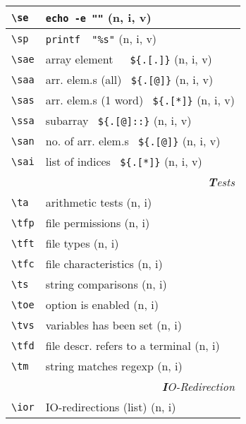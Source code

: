 \documentclass[oneside,11pt,landscape,DIV16]{scrartcl}
\begin{document}
\begin{multicols}{3}
\begin{center}
\begin{tabular}[]{|p{11mm}|p{60mm}|}
%
\hline \verb'\se'  & \verb'echo -e ""'                     \hfill (n, i, v)\\
\hline \verb'\sp'  & \verb'printf  "%s"'                   \hfill (n, i, v)\\
%
\hline \verb'\sae' & array element\ \ \ \verb'${.[.]}'     \hfill (n, i, v)\\
\hline \verb'\saa' & arr. elem.s (all) \ \verb'${.[@]}'    \hfill (n, i, v)\\
\hline \verb'\sas' & arr. elem.s (1 word) \ \verb'${.[*]}' \hfill (n, i, v)\\
\hline \verb'\ssa' & subarray \ \verb'${.[@]::}'           \hfill (n, i, v)\\
\hline \verb'\san' & no. of arr. elem.s \ \verb'${.[@]}'   \hfill (n, i, v)\\
\hline \verb'\sai' & list of indices \ \verb'${.[*]}'      \hfill (n, i, v)\\
\hline
\hline
\multicolumn{2}{|r|}{\textsl{\textbf{T}ests}}                 \\[1.0ex]
\hline \verb'\ta'  & arithmetic tests                  \hfill (n, i)\\
\hline \verb'\tfp' & file permissions                  \hfill (n, i)\\
\hline \verb'\tft' & file types                        \hfill (n, i)\\
\hline \verb'\tfc' & file characteristics              \hfill (n, i)\\
\hline \verb'\ts'  & string comparisons                \hfill (n, i)\\
\hline \verb'\toe' & option is enabled                 \hfill (n, i)\\
\hline \verb'\tvs' & variables has been set            \hfill (n, i)\\
\hline \verb'\tfd' & file descr.  refers to a terminal \hfill (n, i)\\
\hline \verb'\tm'  & string matches regexp             \hfill (n, i)\\
\hline
\hline
\multicolumn{2}{|r|}{\textsl{\textbf{I}O-Redirection}}                 \\[1.0ex]
\hline \verb'\ior'   & IO-redirections (list)           \hfill (n, i)\\

\end{tabular}
\end{center}
\end{multicols}
\end{document}
